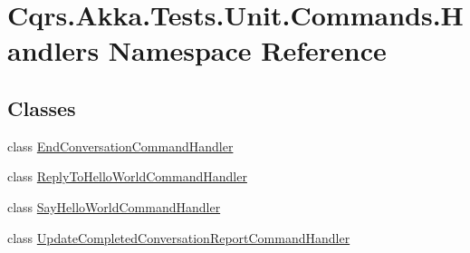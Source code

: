 \hypertarget{namespaceCqrs_1_1Akka_1_1Tests_1_1Unit_1_1Commands_1_1Handlers}{}\section{Cqrs.\+Akka.\+Tests.\+Unit.\+Commands.\+Handlers Namespace Reference}
\label{namespaceCqrs_1_1Akka_1_1Tests_1_1Unit_1_1Commands_1_1Handlers}
\subsection*{Classes}
\begin{DoxyCompactItemize}
\item 
class \hyperlink{classCqrs_1_1Akka_1_1Tests_1_1Unit_1_1Commands_1_1Handlers_1_1EndConversationCommandHandler}{End\+Conversation\+Command\+Handler}
\item 
class \hyperlink{classCqrs_1_1Akka_1_1Tests_1_1Unit_1_1Commands_1_1Handlers_1_1ReplyToHelloWorldCommandHandler}{Reply\+To\+Hello\+World\+Command\+Handler}
\item 
class \hyperlink{classCqrs_1_1Akka_1_1Tests_1_1Unit_1_1Commands_1_1Handlers_1_1SayHelloWorldCommandHandler}{Say\+Hello\+World\+Command\+Handler}
\item 
class \hyperlink{classCqrs_1_1Akka_1_1Tests_1_1Unit_1_1Commands_1_1Handlers_1_1UpdateCompletedConversationReportCommandHandler}{Update\+Completed\+Conversation\+Report\+Command\+Handler}
\end{DoxyCompactItemize}
